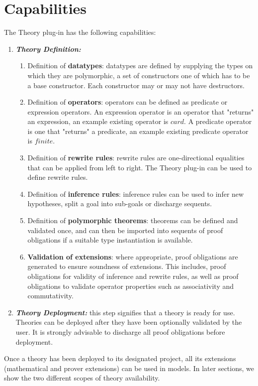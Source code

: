 \documentclass{article}      %
\begin{document}
\section{Capabilities}
The Theory plug-in has the following capabilities:
\begin{enumerate}
	\item \textbf{\textit{Theory Definition:}}
		\begin{enumerate}
			\item Definition of \textbf{datatypes}: datatypes are defined by supplying the types on which they are polymorphic, a set of constructors one of which has to be a base constructor. Each constructor may or may not have destructors.
			\item Definition of \textbf{operators}: operators can be defined as predicate or expression operators. An expression operator is an operator that "returns" an expression, an example existing operator is $card$. A predicate operator is one that "returns" a predicate, an example existing predicate operator is $finite$.
			\item Definition of \textbf{rewrite rules}: rewrite rules are one-directional equalities that can be applied from left to right. The Theory plug-in can be used to define rewrite rules.
			\item Definition of \textbf{inference rules}: inference rules can be used to infer new hypotheses, split a goal into sub-goals or discharge sequents.
			\item Definition of \textbf{polymorphic theorems}: theorems can be defined and validated once, and can then be imported into sequents of proof obligations if a suitable type instantiation is available.
			\item \textbf{Validation of extensions}: where appropriate, proof obligations are generated to ensure soundness of extensions. This includes, proof obligations for validity of inference and rewrite rules, as well as proof obligations to validate operator properties such as associativity and commutativity.
		\end{enumerate}
	\item \textbf{\textit{Theory Deployment:}} this step signifies that a theory is ready for use. Theories can be deployed after they have been optionally validated by the user. It is strongly advisable to discharge all proof obligations before deployment.
\end{enumerate}
Once a theory has been deployed to its designated project, all its extensions (mathematical and prover extensions) can be used in models. In later sections, we show the two different scopes of theory availability.



\end{document}

